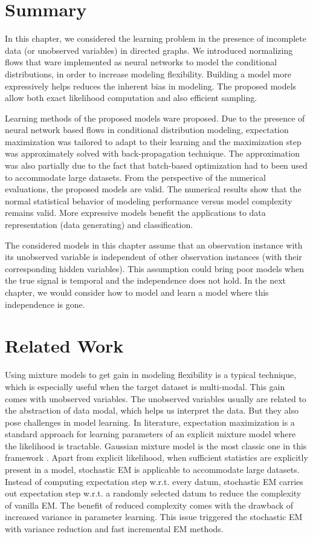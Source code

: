 \section{Summary}
In this chapter, we considered the learning problem in the presence of incomplete data (or unobserved variables) in directed graphs. We introduced normalizing flows that ware implemented as neural networks to model the conditional distributions, in order to increase modeling flexibility. Building a model more expressively helps reduces the inherent bias in modeling. The proposed models allow both exact likelihood computation and also efficient sampling.

Learning methods of the proposed models ware proposed. Due to the presence of neural network based flows in conditional distribution modeling, expectation maximization was tailored to adapt to their learning and the maximization step was approximately solved with back-propagation technique. The approximation was also partially due to the fact that batch-based optimization had to been used to accommodate large datasets. From the perspective of the numerical evaluations, the proposed models are valid. The numerical results show that the normal statistical behavior of modeling performance versus model complexity remains valid. More expressive models benefit the applications to data representation (data generating) and classification.

The considered models in this chapter assume that an observation instance with its unobserved variable is independent of other observation instances (with their corresponding hidden variables). This assumption could bring poor models when the true signal is temporal and the independence does not hold. In the next chapter, we would consider how to model and learn a model where this independence is gone. 

\section{Related Work}

Using mixture models to get gain in modeling flexibility is a typical technique, which is especially useful when the target dataset is multi-modal. This gain comes with unobserved variables. The unobserved variables usually are related to the abstraction of data modal, which helps us interpret the data. But they also pose challenges in model learning. In literature, expectation maximization \cite{dempster1977maximum} is a standard approach for learning parameters of an explicit mixture model where the likelihood is tractable. Gaussian mixture model is the most classic one in this framework \cite{Bishop:2006:PRM:1162264}.
Apart from explicit likelihood, when sufficient statistics are explicitly present in a model, stochastic EM \cite{cappe2009sem} is applicable to accommodate large datasets. Instead of computing expectation step w.r.t. every datum, stochastic EM carries out expectation step w.r.t. a randomly selected datum to reduce the complexity of vanilla EM. The benefit of reduced complexity comes with the drawback of increased variance in parameter learning. This issue triggered the stochastic EM with variance reduction\cite{chen2018emvr} and fast incremental EM \cite{karimi2019incrementalEM} methods.


